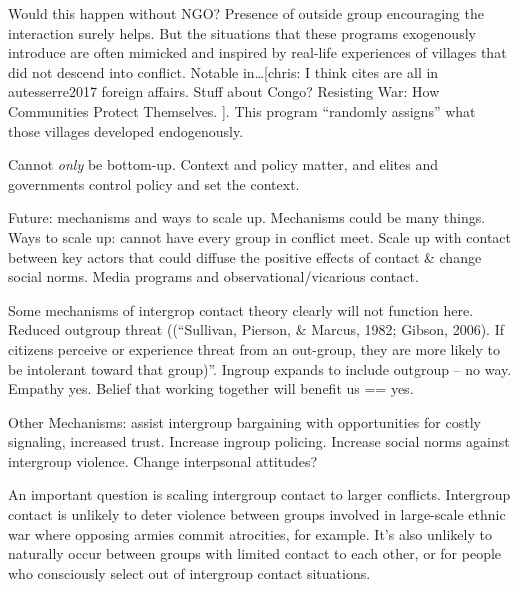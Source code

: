 \documentclass[11pt]{article}
\begin{document}
Would this happen without NGO? Presence of outside group encouraging the
interaction surely helps. But the situations that these programs
exogenously introduce are often mimicked and inspired by real-life
experiences of villages that did not descend into conflict. Notable
in\ldots{}{[}chris: I think cites are all in autesserre2017 foreign
affairs. Stuff about Congo? Resisting War: How Communities Protect
Themselves. {]}. This program ``randomly assigns'' what those villages
developed endogenously.

Cannot \emph{only} be bottom-up. Context and policy matter, and elites
and governments control policy and set the context.

Future: mechanisms and ways to scale up. Mechanisms could be many
things. Ways to scale up: cannot have every group in conflict meet.
Scale up with contact between key actors that could diffuse the positive
effects of contact \& change social norms. Media programs and
observational/vicarious contact.

Some mechanisms of intergrop contact theory clearly will not function
here. Reduced outgroup threat ((``Sullivan, Pierson, \& Marcus, 1982;
Gibson, 2006). If citizens perceive or experience threat from an
out-group, they are more likely to be intolerant toward that group)''.
Ingroup expands to include outgroup -- no way. Empathy yes. Belief that
working together will benefit us == yes.

Other Mechanisms: assist intergroup bargaining with opportunities for
costly signaling, increased trust. Increase ingroup policing. Increase
social norms against intergroup violence. Change interpsonal attitudes?

An important question is scaling intergroup contact to larger conflicts.
Intergroup contact is unlikely to deter violence between groups involved
in large-scale ethnic war where opposing armies commit atrocities, for
example. It's also unlikely to naturally occur between groups with
limited contact to each other, or for people who consciously select out
of intergroup contact situations.
\end{document}

